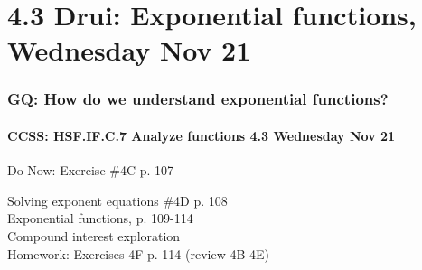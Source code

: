 \documentclass{beamer}
\begin{document}
  \section{4.3 Drui: Exponential functions, Wednesday Nov 21}
    \frame
    {
      \frametitle{GQ: How do we understand exponential functions?}
      \framesubtitle{CCSS: HSF.IF.C.7 Analyze functions    \alert{4.3  Wednesday Nov 21}}

      \begin{block}{Do Now: Exercise \#4C p. 107}
      \end{block}
      Solving exponent equations \#4D p. 108 \\
      Exponential functions, p. 109-114\\
      Compound interest exploration\\ \bigskip
      Homework: Exercises 4F p. 114 (review 4B-4E)
    }
\end{document}
